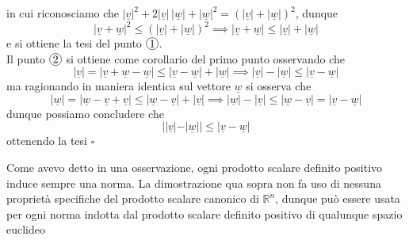 %
in cui riconosciamo che $|\underline{v}|^2 + 2 |\underline{v}| \, |\underline{w}| + |\underline{w}|^2 = (|\underline{v}| + |\underline{w}|)^2$, dunque
%
\[|\underline{v} + \underline{w}|^2 \leq (|\underline{v}| + |\underline{w}|)^2 \implies |\underline{v} + \underline{w}| \leq |\underline{v}| + |\underline{w}|\]
%
e si ottiene la tesi del punto $\circled{1}$. \\
Il punto $\circled{2}$ si ottiene come corollario del primo punto osservando che
%
\[|\underline{v}| = |\underline{v} + \underline{w} - \underline{w}| \leq |\underline{v} - \underline{w}| + |\underline{w}| \implies |\underline{v}| - |\underline{w}| \leq |\underline{v} - \underline{w}| \]
%
ma ragionando in maniera identica sul vettore $\underline{w}$ si osserva che
%
\[|\underline{w}| = |\underline{w} - \underline{v} + \underline{v}| \leq |\underline{w} - \underline{v}| + |\underline{v}| \implies |\underline{w}| - |\underline{v}| \leq |\underline{w} - \underline{v}|= |\underline{v} - \underline{w}|\]
%
dunque possiamo concludere che
%
\[||\underline{v}| - |\underline{w}|| \leq |\underline{v} - \underline{w}|\]
%
ottenendo la tesi
\hfill $\square$
%
\begin{remark}
Come avevo detto in una osservazione, ogni prodotto scalare definito positivo induce sempre una norma. La dimostrazione qua sopra non fa uso di nessuna proprietà specifiche del prodotto scalare canonico di $\mathbb{R}^n$, dunque può essere usata per ogni norma indotta dal prodotto scalare definito positivo di qualunque spazio euclideo
\end{remark}
%
%
\vspace{0.5cm}
